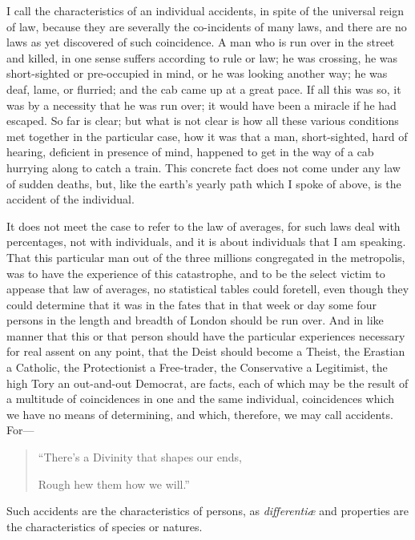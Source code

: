 I call the characteristics of an individual accidents, in spite of
the universal reign of law, because they are severally the
co-incidents of many laws, and there are no laws as yet discovered of
such coincidence. A man who is run over in the street and killed, in
one sense suffers according to rule or law; he was crossing, he was
short-sighted or pre-occupied in mind, or he was looking another way;
he was deaf, lame, or flurried; and the cab came up at a great pace.
If all this was so, it was by a necessity that he was run over; it
would have been a miracle if he had escaped. So far is clear; but what
is not clear is how all these various conditions met together in the
particular case, how it was that a man, short-sighted, hard of
hearing, deficient in presence of mind, happened to get in the way of
a cab hurrying along to catch a train. This concrete fact does not
come under any law of sudden deaths, but, like the earth's yearly
path which I spoke of above, is the accident of the individual.

It does not meet the case to refer to the law of averages, for such
laws deal with percentages, not with individuals, and it is about
individuals that I am speaking. That this particular man out of the
three millions congregated in the metropolis, was to have the
experience of this catastrophe, and to be the select victim to appease
that law of averages, no statistical tables could foretell, even
though they could determine that it was in the fates that in that week
or day some four persons in the length and breadth of London should be
run over. And in like manner that this or that person should have the
particular experiences necessary for real assent on any point, that
the Deist should become a Theist, the Erastian a Catholic, the
Protectionist a Free-trader, the Conservative a Legitimist, the high
Tory an out-and-out Democrat, are facts, each of which may be the
result of a multitude of coincidences in one and the same individual,
coincidences which we have no means of determining, and which,
therefore, we may call accidents. For—

\begin{quote}

``There's a Divinity that shapes our ends,

Rough hew them how we will.''

\end{quote}

Such accidents are the characteristics of persons, as \emph{differentiæ}
and properties are the characteristics of species or natures.

